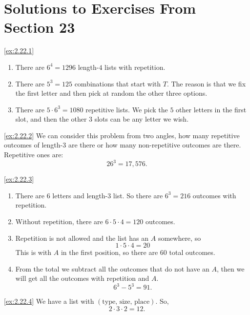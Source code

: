 \section*{Solutions to Exercises From Section 23}
\begin{solution}\label{sol:2.22.1}\ref{ex:2.22.1}
    \begin{enumerate}
        \item There are $6^{4}=1296$ length-$4$ lists with repetition.
        \item There are $5^{3}=125$ combinations that start with $T$. The reason is that we fix the first letter and then pick at random the other three options. 
        \item There are $5\cdot 6^{3}=1080$ repetitive lists. We pick the $5$ other letters in the first slot, and then the other $3$ slots can be any letter we wish.
    \end{enumerate}
\end{solution}

\begin{solution}\label{sol:2.22.2}\ref{ex:2.22.2}
    We can consider this problem from two angles, how many repetitive outcomes of length-$3$ are there or how many non-repetitive outcomes are there. 
    Repetitive ones are:
    $$
    26^{3}=17,576.
    $$
\end{solution}

\begin{solution}\label{sol:2.22.3}\ref{ex:2.22.3}
    \begin{enumerate}
        \item There are $6$ letters and length-$3$ list. So there are $6^{3}=216$ outcomes with repetition. 
        \item Without repetition, there are $6\cdot5\cdot4=120$ outcomes. 
        \item Repetition is not allowed and the list has an $A$ somewhere, so 
        $$
        1\cdot 5\cdot 4 = 20
        $$
        This is with $A$ in the first position, so there are $60$ total outcomes. 
        \item From the total we subtract all the outcomes that do not have an $A$, then we will get all the outcomes with repetition and $A$. 
        $$
        6^{3}-5^{3}=91.
        $$
    \end{enumerate}
\end{solution}

\begin{solution}\label{sol:2.22.4}\ref{ex:2.22.4}
    We have a list with $(\text{type, size, place})$. So, 
    $$
    2\cdot 3\cdot 2 = 12.
    $$
\end{solution}

